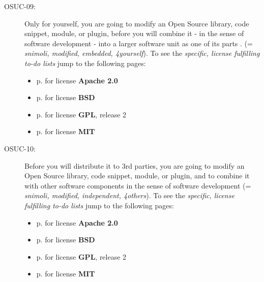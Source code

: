 \begin{description}
\item[OSUC-09:]\label{OSUC-09-DEF} Only for yourself, you are going to modify an
Open Source library, code snippet, module, or plugin, before you will combine it
- in the sense of software development - into a larger software unit as one of
its parts . (= \textit{snimoli, modified, embedded, 4yourself}). 
To see the \textit{specific, license fulfilling to-do lists} jump to the
following pages:
  \begin{itemize}
    \item p. \pageref{OSUC-09-Apache20} for license \textbf{Apache 2.0}
    \item p. \pageref{OSUC-09-BSD} for license \textbf{BSD}
    \item p. \pageref{OSUC-09-GPL2X} for license \textbf{GPL}, release 2
    \item p. \pageref{OSUC-09-MIT} for license \textbf{MIT}
  \end{itemize}

\item[OSUC-10:]\label{OSUC-10-DEF} Before you will distribute it to 3rd parties,
you are going to modify an Open Source library, code snippet, module, or plugin,
and to combine it with other software components in the sense of
software development (= \textit{snimoli, modified, independent, 4others}). 
To see the \textit{specific, license fulfilling to-do lists} jump to the
following pages:
  \begin{itemize}
    \item p. \pageref{OSUC-10-Apache20} for license \textbf{Apache 2.0}
    \item p. \pageref{OSUC-10-BSD} for license \textbf{BSD}
    \item p. \pageref{OSUC-10-GPL2X} for license \textbf{GPL}, release 2
    \item p. \pageref{OSUC-10-MIT} for license \textbf{MIT}
  \end{itemize}
\end{description}

%
